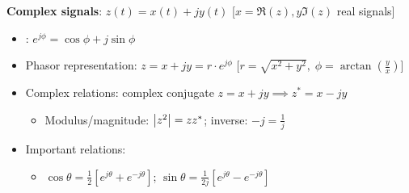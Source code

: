 \documentclass[12pt]{extarticle}
\begin{document}
\newp
\textbf{Complex signals}: $z(t)=x(t)+jy(t)$ [$x=\Re(z),y\Im(z)$ real signals] \begin{itemize}
    \item {}: $e^{j\phi}=\cos\phi+j\sin\phi$
    \item Phasor representation: $z=x+jy=r\cdot e^{j\phi}$ [$r=\sqrt{x^2+y^2},\;\phi=\arctan(\frac{y}{x})$]
    \item Complex relations: complex conjugate $z=x+jy\implies z^\ast=x-jy$ \begin{itemize}
        \item Modulus/magnitude: $\left|z^2\right|=zz^\ast$; inverse: $-j=\frac{1}{j}$
    \end{itemize}
    \item Important relations: \begin{itemize}
        \item $\cos\theta=\frac{1}{2}[e^{j\theta}+e^{-j\theta}]$; \quad$\sin\theta=\frac{1}{2j}[e^{j\theta}-e^{-j\theta}]$
    \end{itemize}
\end{itemize}
\end{document}
